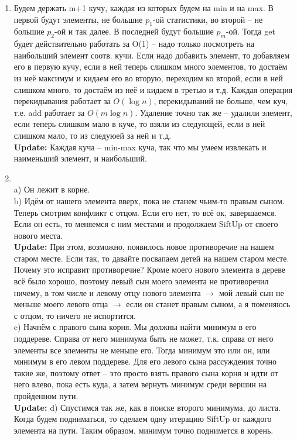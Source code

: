 \documentclass[12pt]{article}
\begin{document}
\begin{enumerate}
	\item Будем держать m+1 кучу, каждая из которых будем на min и на max. В первой будут элементы, не большие $p_1$-ой статистики, во второй -- не большие $p_2$-ой и так далее. В последней будут большие $p_m$-ой. Тогда get будет действительно работать за O(1) -- надо только посмотреть на наибольший элемент соотв. кучи. Если надо добавить элемент, то добавляем его в первую кучу, если в ней теперь слишком много элементов, то достаём из неё максимум и кидаем его во вторую, переходим ко второй, если в ней слишком много, то достаём из неё и кидаем в третью и т.д. Каждая операция перекидывания работает за $O(\log n)$, перекидываний не больше, чем куч, т.е. add работает за $O(m\log n)$. Удаление точно так же -- удалили элемент, если теперь слишком мало в куче, то взяли из следующей, если в ней слишком мало, то из следуюей за ней и т.д. \\
	\textbf{Update:} Каждая куча -- min-max куча, так что мы умеем извлекать и наименьший элемент, и наибольший. \\
	\item ~\\
	a) Он лежит в корне. \\
	b) Идём от нашего элемента вверх, пока не станем чьим-то правым сыном. Теперь смотрим конфликт с отцом. Если его нет, то всё ок, завершаемся. Если он есть, то меняемся с ним местами и продолжаем SiftUp от своего нового места. \\
	\textbf{Update:} При этом, возможно, появилось новое противоречие на нашем старом месте. Если так, то давайте посвапаем детей на нашем старом месте. Почему это исправит противоречие? Кроме моего нового элемента в дереве всё было хорошо, поэтому левый сын моего элемента не противоречил ничему, в том числе и левому отцу нового элемента $\to$ мой левый сын не меньше моего левого отца $\to$ если он станет правым сыном, а я поменяюсь с отцом, то ничего не испортится. \\
	c) Начнём с правого сына корня. Мы должны найти минимум в его поддереве. Справа от него минимума быть не может, т.к. справа от него элементы все элементы не меньше его. Тогда минимум это или он, или минимум в его левом поддереве. Для его левого сына рассуждения точно такие же, поэтому ответ -- это просто взять правого сына корня и идти от него влево, пока есть куда, а затем вернуть минимум среди вершин на пройденном пути. \\
	\textbf{Update:} d) Спустимся так же, как в поиске второго минимума, до листа. Когда будем подниматься, то сделаем одну итерацию SiftUp от каждого элемента на пути. Таким образом, минимум точно поднимется в корень. \\
\end{enumerate}
\end{document}
